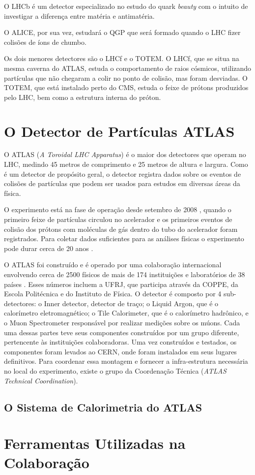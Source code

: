 O LHCb é um detector especializado no estudo do quark \textit{beauty} com o
intuito de investigar a diferença entre matéria e antimatéria.

O ALICE, por sua vez, estudará o QGP que será formado quando o
LHC fizer colisões de íons de chumbo.

Os dois menores detectores são o LHCf e o TOTEM. O LHCf, que se situa na mesma
caverna do ATLAS, estuda o comportamento de raios cósmicos, utilizando
partículas que não chegaram a colir no ponto de colisão, mas foram desviadas.
O TOTEM, que está instalado perto do CMS, estuda o feixe de prótons produzidos
pelo LHC, bem como a estrutura interna do próton.

\section{O Detector de Partículas ATLAS}
\label{sec:ATLAS}

O ATLAS (\textit{A Toroidal LHC Apparatus}) é o maior dos detectores que operam
no LHC, medindo 45 metros de comprimento e 25 metros de altura e largura. Como é
um detector de propósito geral, o detector registra dados sobre os eventos de
colisões de partículas que podem ser usados para estudos em diversas áreas da
física. 

O experimento está na fase de operação desde setembro de 2008 \cite{webLHCFirstBeam},
quando o primeiro feixe de partículas circulou no acelerador e os primeiros
eventos de colisão dos prótons com moléculas de gás dentro do tubo do acelerador
foram registrados. Para coletar dados suficientes para as análises físicas o
experimento pode durar cerca de 20 anos \cite{ATLAS_TDR}.

O ATLAS foi construído e é operado por uma colaboração internacional envolvendo
cerca de 2500 físicos de mais de 174 instituições e laboratórios de 38 países
\cite{webATLAS}. Esses números incluem a UFRJ, que participa através da COPPE,
da Escola Politécnica e do Instituto de Física. O detector é composto por 4
sub-detectores: o Inner detector, detector de traço; o Liquid Argon, que é o
calorímetro eletromagnético; o Tile Calorimeter, que é o calorímetro hadrônico,
e o Muon Spectrometer responsável por realizar medições sobre os múons. Cada uma
dessas partes teve seus componentes construídos por um grupo diferente,
pertencente às instituições colaboradoras.  Uma vez construídos e testados, os
componentes foram levados ao CERN, onde foram instalados em seus lugares
definitivos. Para coordenar essa montagem e fornecer a infra-estrutura
necessária no local do experimento, existe o grupo da Coordenação Técnica
({\it ATLAS Technical Coordination}).

\subsection{O Sistema de Calorimetria do ATLAS}
\label{ssec:calorimetria}


\section{Ferramentas Utilizadas na Colaboração}
\label{sec:ferramentas}

